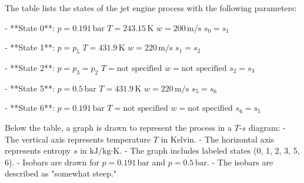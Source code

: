 The table lists the states of the jet engine process with the following parameters:  

- **State 0**:  
  \( p = 0.191 \, \text{bar} \)  
  \( T = 243.15 \, \text{K} \)  
  \( w = 200 \, \text{m/s} \)  
  \( s_0 = s_1 \)  

- **State 1**:  
  \( p = p_5 \)  
  \( T = 431.9 \, \text{K} \)  
  \( w = 220 \, \text{m/s} \)  
  \( s_1 = s_2 \)  

- **State 2**:  
  \( p = p_3 = p_2 \)  
  \( T = \text{not specified} \)  
  \( w = \text{not specified} \)  
  \( s_2 = s_3 \)  

- **State 5**:  
  \( p = 0.5 \, \text{bar} \)  
  \( T = 431.9 \, \text{K} \)  
  \( w = 220 \, \text{m/s} \)  
  \( s_5 = s_6 \)  

- **State 6**:  
  \( p = 0.191 \, \text{bar} \)  
  \( T = \text{not specified} \)  
  \( w = \text{not specified} \)  
  \( s_6 = s_5 \)  

Below the table, a graph is drawn to represent the process in a \( T \)-\( s \) diagram:  
- The vertical axis represents temperature \( T \) in Kelvin.  
- The horizontal axis represents entropy \( s \) in \( \text{kJ/kg·K} \).  
- The graph includes labeled states (0, 1, 2, 3, 5, 6).  
- Isobars are drawn for \( p = 0.191 \, \text{bar} \) and \( p = 0.5 \, \text{bar} \).  
- The isobars are described as "somewhat steep."